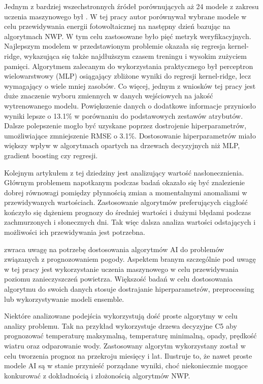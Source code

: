 Jednym z bardziej wszechstronnych źródeł porównujących aż 24 modele z zakresu
uczenia maszynowego był \cite{comparison-of-ml-methods}.
W tej pracy autor porównywał wybrane modele w celu przewidywania energii fotowoltaicznej
na następny dzień bazując na algorytmach NWP. W tym celu zastosowane było pięć metryk
weryfikacyjnych. Najlepszym modelem w przedstawionym problemie okazała się regresja 
kernel-ridge, wykazująca się także najdłuższym czasem treningu i wysokim zużyciem pamięci.
Algorytmem zalecanym do wykorzystania praktycznego był perceptron wielowarstwowy (MLP)
osiągający zbliżone wyniki do regresji kernel-ridge, lecz wymagający o wiele mniej zasobów.
Co więcej, jednym z wniosków tej pracy jest duże znaczenie wyboru zmiennych w danych wejściowych
na jakość wytrenowanego modelu. Powiększenie danych o dodatkowe informacje przyniosło
wyniki lepsze o 13.1\% w porównaniu do podstawowych zestawów atrybutów. Dalsze polepszenie
mogło być uzyskane poprzez dostrojenie hiperparametrów, umożliwiające zmniejszenie 
RMSE o 3.1\%. Dostosowanie hiperparametrów miało większy wpływ w algorytmach opartych
na drzewach decyzyjnych niż MLP, gradient boosting czy regresji. 

Kolejnym artykułem z tej dziedziny jest \cite{coupling-data-science}
analizujący wartość nasłonecznienia. Głównym problemem napotkanym podczas
badań okazało się być znalezienie dobrej równowagi pomiędzy płynnością zmian a 
momentalnymi anomaliami w przewidywanych wartościach. Zastosowanie algorytmów
preferujących ciągłość kończyło się dążeniem prognozy do średniej wartości i 
dużymi błędami podczas zachmurzonych i słonecznych dni. Tak więc dalsza analiza 
wartości odstających i możliwości ich przewidywania jest potrzebna.

\cite{development-and-application-of-ml-in}
zwraca uwagę na potrzebę dostosowania algorytmów AI do problemów związanych z prognozowaniem
pogody. Aspektem branym szczególnie pod uwagę w tej pracy jest wykorzystanie uczenia
maszynowego w celu przewidywania poziomu zanieczyszczeń powietrza. Większość
badań w celu dostosowania algorytmu do swoich danych stosuje dostrajanie hiperparametrów,
preprocessing lub wykorzystywanie modeli ensemble. 

Niektóre analizowane podejścia wykorzystują dość proste algorytmy w celu analizy
problemu. Tak na przykład 
\cite{weather-forecast-prediction-data-mining} wykorzystuje drzewa decyzyjne C5 
aby prognozować temperaturę maksymalną, temperaturę minimalną, opady, prędkość wiatru
oraz odparowanie wody. Zastosowany algorytm wykorzystany został w celu tworzenia prognoz
na przekroju miesięcy i lat. Ilustruje to, że nawet proste modele AI są w stanie 
przynieść porządane wyniki, choć niekoniecznie mogące konkurować z dokładnością i 
złożonością algorytmów NWP.

